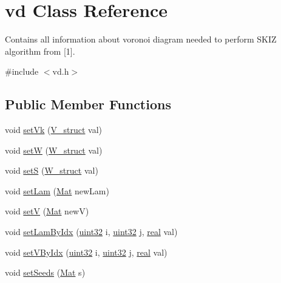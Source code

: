 \hypertarget{classvd}{}\section{vd Class Reference}
\label{classvd}


Contains all information about voronoi diagram needed to perform S\+K\+IZ algorithm from \mbox{[}1\mbox{]}.  




{\ttfamily \#include $<$vd.\+h$>$}

\subsection*{Public Member Functions}
\begin{DoxyCompactItemize}
\item 
void \mbox{\hyperlink{classvd_a062d265bd642352d6f7e8cc8685ed7a8}{set\+Vk}} (\mbox{\hyperlink{structV__struct}{V\+\_\+struct}} val)
\item 
void \mbox{\hyperlink{classvd_a85ee3a096c181f76d15f4b7fcf137fe7}{setW}} (\mbox{\hyperlink{structW__struct}{W\+\_\+struct}} val)
\item 
void \mbox{\hyperlink{classvd_a0b4c53a592ec499899a37c2e6364806a}{setS}} (\mbox{\hyperlink{structW__struct}{W\+\_\+struct}} val)
\item 
void \mbox{\hyperlink{classvd_ae13e9e465d08425218bd8f85ce420c05}{set\+Lam}} (\mbox{\hyperlink{typedefs_8cpp_a9fa28c1f74e909474857584f5c7b0088}{Mat}} new\+Lam)
\item 
void \mbox{\hyperlink{classvd_a33e792915ebd0295a3475fe686b41ee9}{setV}} (\mbox{\hyperlink{typedefs_8cpp_a9fa28c1f74e909474857584f5c7b0088}{Mat}} newV)
\item 
void \mbox{\hyperlink{classvd_a8df228a05762e0c0a2bccc28094a1f92}{set\+Lam\+By\+Idx}} (\mbox{\hyperlink{typedefs_8cpp_a8ad23e2333787a214e20a58a284a5a60}{uint32}} i, \mbox{\hyperlink{typedefs_8cpp_a8ad23e2333787a214e20a58a284a5a60}{uint32}} j, \mbox{\hyperlink{typedefs_8cpp_a58a0c7cf2501f4492da833421be92547}{real}} val)
\item 
void \mbox{\hyperlink{classvd_a29670919bb8d5b2f2f0235ddfda6484e}{set\+V\+By\+Idx}} (\mbox{\hyperlink{typedefs_8cpp_a8ad23e2333787a214e20a58a284a5a60}{uint32}} i, \mbox{\hyperlink{typedefs_8cpp_a8ad23e2333787a214e20a58a284a5a60}{uint32}} j, \mbox{\hyperlink{typedefs_8cpp_a58a0c7cf2501f4492da833421be92547}{real}} val)
\item 
void \mbox{\hyperlink{classvd_a739318bbb45d4facfcc1899c71b91720}{set\+Seeds}} (\mbox{\hyperlink{typedefs_8cpp_a9fa28c1f74e909474857584f5c7b0088}{Mat}} s)

\end{DoxyCompactItemize}
